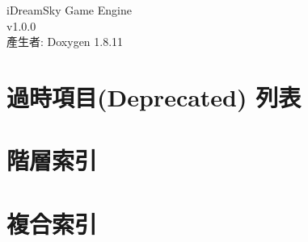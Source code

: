 \documentclass[twoside]{book}
\newcommand{\+}{\discretionary{\mbox{\scriptsize$\hookleftarrow$}}{}{}}
\newcommand{\clearemptydoublepage}{%
  \newpage{\pagestyle{empty}\cleardoublepage}%
}
\begin{document}
\hypersetup{pageanchor=false,
             bookmarksnumbered=true,
             pdfencoding=unicode
            }
\begin{titlepage}
\vspace*{7cm}
\begin{center}%
{\Large i\+Dream\+Sky Game Engine \\[1ex]\large v1.\+0.\+0 }\\
\vspace*{1cm}
{\large 產生者\+: Doxygen 1.8.11}\\
\end{center}
\end{titlepage}
\clearemptydoublepage
\tableofcontents
\clearemptydoublepage
{}
\hypersetup{pageanchor=true}

\chapter{過時項目(Deprecated) 列表}
\label{deprecated}
\hypertarget{deprecated}{}

\chapter{階層索引}

\chapter{複合索引}

\end{document}

